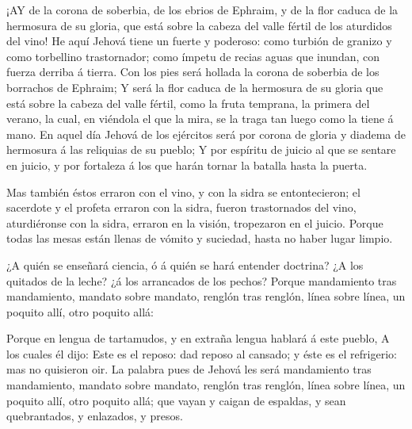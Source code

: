  ¡AY de la corona de soberbia, de los ebrios de Ephraim, y
de la flor caduca de la hermosura de su gloria, que está sobre la cabeza
del valle fértil de los aturdidos del vino!  He aquí Jehová
tiene un fuerte y poderoso: como turbión de granizo y como torbellino
trastornador; como ímpetu de recias aguas que inundan, con fuerza
derriba á tierra.  Con los pies será hollada la corona de
soberbia de los borrachos de Ephraim;  Y será la flor caduca
de la hermosura de su gloria que está sobre la cabeza del valle fértil,
como la fruta temprana, la primera del verano, la cual, en viéndola el
que la mira, se la traga tan luego como la tiene á mano.  En
aquel día Jehová de los ejércitos será por corona de gloria y diadema de
hermosura á las reliquias de su pueblo;  Y por espíritu de
juicio al que se sentare en juicio, y por fortaleza á los que harán
tornar la batalla hasta la puerta.

 Mas también éstos erraron con el vino, y con la sidra se
entontecieron; el sacerdote y el profeta erraron con la sidra, fueron
trastornados del vino, aturdiéronse con la sidra, erraron en la visión,
tropezaron en el juicio.  Porque todas las mesas están
llenas de vómito y suciedad, hasta no haber lugar limpio.

 ¿A quién se enseñará ciencia, ó á quién se hará entender
doctrina? ¿A los quitados de la leche? ¿á los arrancados de los pechos?
 Porque mandamiento tras mandamiento, mandato sobre
mandato, renglón tras renglón, línea sobre línea, un poquito allí, otro
poquito allá:

 Porque en lengua de tartamudos, y en extraña lengua
hablará á este pueblo,  A los cuales él dijo: Este es el
reposo: dad reposo al cansado; y éste es el refrigerio: mas no quisieron
oir.  La palabra pues de Jehová les será mandamiento tras
mandamiento, mandato sobre mandato, renglón tras renglón, línea sobre
línea, un poquito allí, otro poquito allá; que vayan y caigan de
espaldas, y sean quebrantados, y enlazados, y presos.

